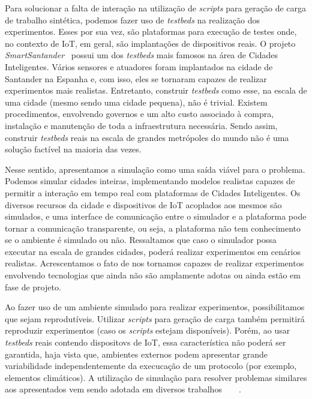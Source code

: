 Para solucionar a falta de interação na utilização de \textit{scripts} para geração de carga de trabalho sintética, podemos fazer uso de \textit{testbeds} na realização dos experimentos.
Esses por sua vez, são plataformas para execução de testes onde, no contexto de IoT, em geral, são implantações de dispositivos reais.
O projeto \textit{SmartSantander}~\citep{sanchez_2014} possui um dos \textit{testbeds} mais famosos na área de Cidades Inteligentes.
Vários sensores e atuadores foram implantados na cidade de Santander na Espanha e, com isso, eles se tornaram capazes de realizar experimentos mais realistas.
Entretanto, construir \textit{testbeds} como esse, na escala de uma cidade (mesmo sendo uma cidade pequena), não é trivial.
Existem procedimentos, envolvendo governos e um alto custo associado à compra, instalação e manutenção de toda a infraestrutura necessária.
Sendo assim, construir \textit{testbeds} reais na escala de grandes metrópoles do mundo não é uma solução factível na maioria das vezes.

Nesse sentido, apresentamos a simulação como uma saída viável para o problema.
Podemos simular cidades inteiras, implementando modelos realistas capazes de permitir a interação em tempo real com plataformas de Cidades Inteligentes.
Os diversos recursos da cidade e dispositivos de IoT acoplados aos mesmos são simulados, e uma interface de comunicação entre o simulador e a plataforma pode tornar a comunicação transparente, ou seja,
a plataforma não tem conhecimento se o ambiente é simulado ou não.
Ressaltamos que caso o simulador possa executar na escala de grandes cidades, poderá realizar experimentos em cenários realistas.
Acrescentamos o fato de nos tornamos capazes de realizar experimentos envolvendo tecnologias que ainda não são amplamente adotas ou ainda estão em fase de projeto.

Ao fazer uso de um ambiente simulado para realizar experimentos, possibilitamos que sejam reprodutíveis.
Utilizar \textit{scripts} para geração de carga também permitirá reproduzir experimentos (caso os \textit{scripts} estejam disponíveis).
Porém, ao usar \textit{testbeds} reais contendo dispositovs de IoT, essa característica não poderá ser garantida, haja vista que, ambientes externos podem apresentar grande variabilidade independentemente da
execucação de um protocolo (por exemplo, elementos climáticos).
A utilização de simulação para resolver problemas similares aos apresentados vem sendo adotada em diversos trabalhos~\citep{karnouskos_2009}~\citep{fleischer_1994}~\citep{dupuy_1990}~\citep{boukerche_2001}.

